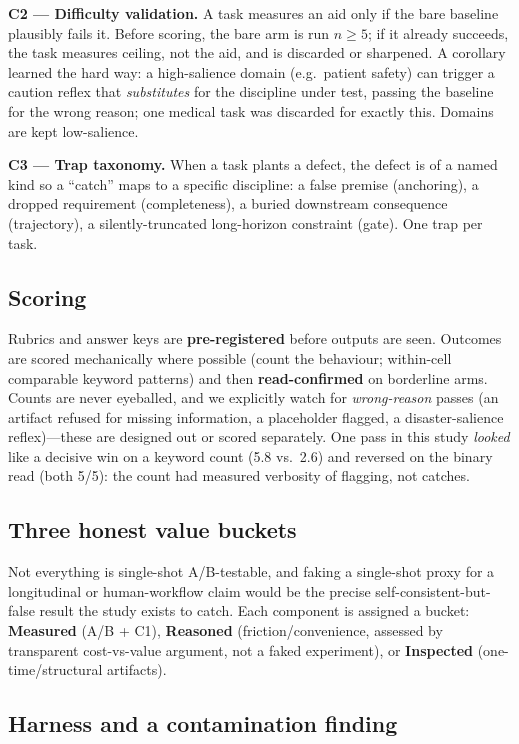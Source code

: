 \documentclass[11pt]{article}
\begin{document}
\textbf{C2 --- Difficulty validation.} A task measures an aid only if the bare baseline
plausibly fails it. Before scoring, the bare arm is run $n \geq 5$; if it already succeeds,
the task measures ceiling, not the aid, and is discarded or sharpened. A corollary
learned the hard way: a high-salience domain (e.g.\ patient safety) can trigger a
caution reflex that \emph{substitutes} for the discipline under test, passing the baseline
for the wrong reason; one medical task was discarded for exactly this. Domains are kept
low-salience.

\textbf{C3 --- Trap taxonomy.} When a task plants a defect, the defect is of a named kind so a
``catch'' maps to a specific discipline: a false premise (anchoring), a dropped
requirement (completeness), a buried downstream consequence (trajectory), a
silently-truncated long-horizon constraint (gate). One trap per task.

\subsection{Scoring}

Rubrics and answer keys are \textbf{pre-registered} before outputs are seen. Outcomes are
scored mechanically where possible (count the behaviour; within-cell comparable
keyword patterns) and then \textbf{read-confirmed} on borderline arms. Counts are never
eyeballed, and we explicitly watch for \emph{wrong-reason} passes (an artifact refused for
missing information, a placeholder flagged, a disaster-salience reflex)---these are
designed out or scored separately. One pass in this study \emph{looked} like a decisive win
on a keyword count (5.8 vs.\ 2.6) and reversed on the binary read (both 5/5): the count
had measured verbosity of flagging, not catches.

\subsection{Three honest value buckets}

Not everything is single-shot A/B-testable, and faking a single-shot proxy for a
longitudinal or human-workflow claim would be the precise self-consistent-but-false
result the study exists to catch. Each component is assigned a bucket: \textbf{Measured}
(A/B + C1), \textbf{Reasoned} (friction/convenience, assessed by transparent cost-vs-value
argument, not a faked experiment), or \textbf{Inspected} (one-time/structural artifacts).

\subsection{Harness and a contamination finding}
\end{document}
